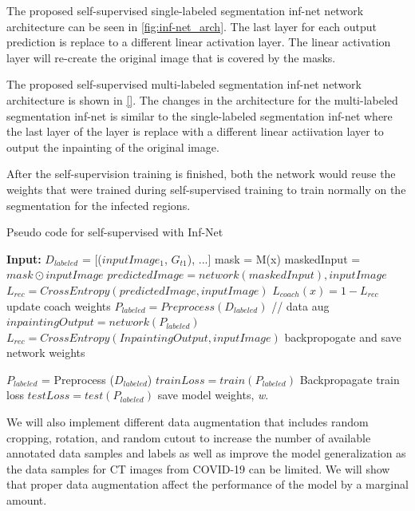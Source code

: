 The proposed self-supervised single-labeled segmentation inf-net network architecture can be seen in \ref{fig:inf-net_arch}. The last layer for each output prediction is replace to a different linear activation layer. The linear activation layer will re-create the original image that is covered by the masks. 

The proposed self-supervised multi-labeled segmentation inf-net network architecture is shown in \ref{}. The changes in the architecture for the multi-labeled segmentation inf-net is similar to the single-labeled segmentation inf-net where the last layer of the layer is replace with a different linear actiivation layer to output the inpainting of the original image. 

After the self-supervision training is finished, both the network would reuse the weights that were trained during self-supervised training to train normally on the segmentation for the infected regions.

\begin{algorithm}
	\caption{Pseudo code for self-supervised with Inf-Net}
	\label{alg:self-inf-net}
	\begin{algorithmic}
		\STATE \textbf{Input:} $D_{labeled}$ = [($inputImage_1$, $G_{t1}$), ...]
			\STATE mask = M(x)
			\STATE maskedInput = $mask \odot inputImage$
			\STATE $ predictedImage =network(maskedInput), inputImage$
			\STATE $L_{rec} = CrossEntropy(predictedImage, inputImage)$
			\STATE $L_{coach}(x) = 1 - L_{rec}$
			\STATE update coach weights
			\ENDFOR
			\STATE $P_{labeled} = Preprocess(D_{labeled})$ // data aug
			\STATE $inpaintingOutput = network(P_{labeled})$
			\STATE $L_{rec} = CrossEntropy(InpaintingOutput, inputImage)$
			\STATE backpropogate and save network weights
			\ENDFOR
		\ENDFOR 
		

		\STATE $P_{labeled}$ = Preprocess ($D_{labeled}$)
		\STATE $trainLoss = train(P_{labeled})$
		\STATE Backpropagate train loss
		\STATE $testLoss = test(P_{labeled})$
		\STATE save model weights, \textit{w}.
		\ENDFOR
	\end{algorithmic}
\end{algorithm}

We will also implement different data augmentation that includes random cropping, rotation, and random cutout \cite{ref7,ref15,ref16} to increase the number of available annotated data samples and labels as well as improve the model generalization as the data samples for CT images from COVID-19 can be limited. We will show that proper data augmentation affect the performance of the model by a marginal amount.



